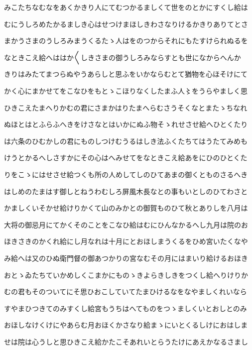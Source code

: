 \documentclass[a4paper,11pt,landscape]{ltjtarticle}
\begin{document}
みこたちなむなをあくかきり人にてむつかるましくて世をのとかにすくし給は
\par\medskip
むにうしろめたかるましき心はせつけまほしきわさなりけるかきりありてとさ
\par\medskip
まかうさまのうしろみまうくるたゝ人はをのつからそれにもたすけられぬるを
\par\medskip
なときこえ給へははか〱しきさまの御うしろみならすとも世になからへんか
\par\medskip
きりはみたてまつらぬやうあらしと思ふをいかならむとて猶物を心ほそけにて
\par\medskip
かく心にまかせてをこなひをもとゝこほりなくしたまふ人〻をうらやましく思
\par\medskip
ひきこえたまへりかむの君にさまかはりたまへらむさうそくなとまたゝちなれ
\par\medskip
ぬほとはとふらふへきをけさなとはいかにぬふ物そゝれせさせ給へひとくたり
\par\medskip
は六条のひむかしの君にものしつけむうるはしき法ふくたちてはうたてみめも
\par\medskip
けうとかるへしさすかにその心はへみせてをなときこえ給あをにひのひとくた
\par\medskip
りをこゝにはせさせ給つくも所の人めしてしのひてあまの御くとものさるへき
\par\medskip
はしめのたまはす御しとねうわむしろ屏風木長なとの事もいとしのひてわさと
\par\medskip
かましくいそかせ給けりかくて山のみかとの御賀ものひて秋とありしを八月は
\par\medskip
大将の御忌月にてかくそのことをこなひ給はむにひんなかるへし九月は院のお
\par\medskip
ほきさきのかくれ給にし月なれは十月にとおほしまうくるをひめ宮いたくなや
\par\medskip
み給へは又のひぬ衛門督の御あつかりの宮なむその月にはまいり給けるおほき
\par\medskip
おとゝゐたちていかめしくこまかにものゝきよらきしきをつくし給へりけりか
\par\medskip
むの君もそのついてにそ思ひおこしていてたまひけるなをなやましくれいなら
\par\medskip
すやまひつきてのみすくし給宮もうちはへてものをつゝましくいとおしとのみ
\par\medskip
おほしなけくけにやあらむ月おほくかさなり給まゝにいとくるしけにおはしま
\par\medskip
せは院は心うしと思ひきこえ給かたこそあれいとらうたけにあえかなるさまし
\par\medskip
\end{document}
